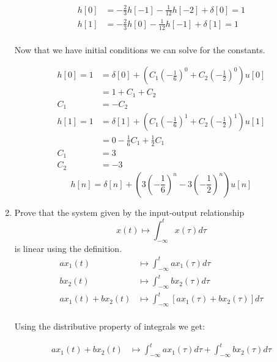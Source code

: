 \documentclass{article}
\begin{document}
\begin{enumerate}
\begin{equation}
    \end{equation}
    \begin{align}
        h[0] &= -\frac{2}{3}h[-1] - \frac{1}{12}h[-2] + \delta[0] = 1\\
        h[1] &= -\frac{2}{3}h[0] - \frac{1}{12}h[-1] + \delta[1] = 1\\
    \end{align}
    \begin{center}
        Now that we have initial conditions we can solve for the constants.
    \end{center}
    \begin{align}
        h[0] = 1 &= \delta[0] + \left(C_1\left(-\frac{1}{6}\right)^0 +  C_2\left(-\frac{1}{2}\right)^0 \right)u[0]\\
        &= 1 + C_1 + C_2\\
        C_1 &= -C_2\\
        h[1] = 1 &= \delta[1] + \left(C_1\left(-\frac{1}{6}\right)^1 +  C_2\left(-\frac{1}{2}\right)^1 \right)u[1]\\
        &= 0 - \frac{1}{6}C_1 + \frac{1}{2}C_1\\
        C_1 &= 3\\
        C_2 &= -3
    \end{align}
    \begin{equation}
        \boxed{h[n] = \delta[n] + \left(3\left(-\frac{1}{6}\right)^n - 3\left(-\frac{1}{2}\right)^n \right)u[n]}
    \end{equation}
    \newpage
    \item Prove that the system given by the input-output relationship
    \begin{equation}
        x(t) \mapsto \int_{-\infty}^{t} x(\tau)d\tau
    \end{equation}
    is linear using the definition.
    \begin{align}
        ax_1(t) &\mapsto \int_{-\infty}^{t} ax_1(\tau)d\tau\\
        bx_2(t) &\mapsto \int_{-\infty}^{t} bx_2(\tau)d\tau\\
        ax_1(t) + bx_2(t) &\mapsto \int_{-\infty}^{t} [ax_1(\tau) + bx_2(\tau)]d\tau\\
    \end{align}
    \begin{center}
        Using the distributive property of integrals we get:
    \end{center}
    \begin{align}
        ax_1(t) + bx_2(t) &\mapsto \int_{-\infty}^{t}ax_1(\tau)d\tau + \int_{-\infty}^{t}bx_2(\tau)d\tau

\end{align}
\end{enumerate}
\end{document}
